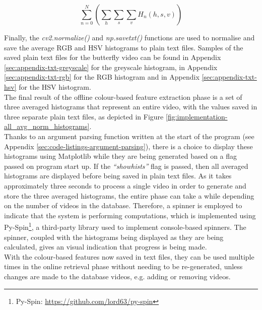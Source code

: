 \begin{equation}
\label{eq:average-hsv-histogram}
    \sum_{n=0}^{N}(\sum_h \sum_s \sum_v H_n(h,s,v))
\end{equation}

Finally, the \textit{cv2.normalize()} and \textit{np.savetxt()} functions are used to normalise and save the average RGB and HSV histograms to plain text files. Samples of the saved plain text files for the butterfly video can be found in Appendix \ref{sec:appendix-txt-greyscale} for the greyscale histogram, in Appendix \ref{sec:appendix-txt-rgb} for the RGB histogram and in Appendix \ref{sec:appendix-txt-hsv} for the HSV histogram.\\

The final result of the offline colour-based feature extraction phase is a set of three averaged histograms that represent an entire video, with the values saved in three separate plain text files, as depicted in Figure \ref{fig:implementation-all_avg_norm_histograms}.\\

Thanks to an argument parsing function written at the start of the program (see Appendix \ref{sec:code-listings-argument-parsing}), there is a choice to display these histograms using Matplotlib while they are being generated based on a flag passed on program start up. If the \textit{``showhists''} flag is passed, then all averaged histograms are displayed before being saved in plain text files. As it takes approximately three seconds to process a single video in order to generate and store the three averaged histograms, the entire phase can take a while depending on the number of videos in the database. Therefore, a spinner is employed to indicate that the system is performing computations, which is implemented using Py-Spin\footnote{Py-Spin: \url{https://github.com/lord63/py-spin}}, a third-party library used to implement console-based spinners. The spinner, coupled with the histograms being displayed as they are being calculated, gives an visual indication that progress is being made.\\

With the colour-based features now saved in text files, they can be used multiple times in the online retrieval phase without needing to be re-generated, unless changes are made to the database videos, e.g. adding or removing videos.

